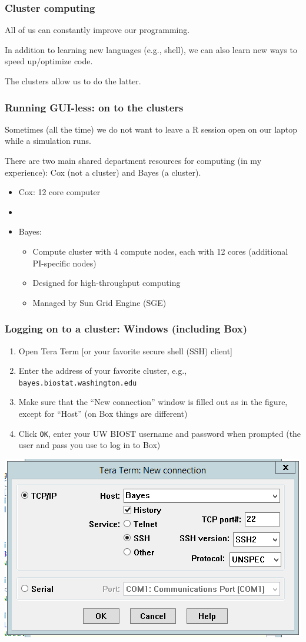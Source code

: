 \documentclass[12pt, 
hyperref={colorlinks=true, linkcolor=blue, urlcolor=cyan}]{beamer}
\newcommand{\myframe}[1]{\begin{frame} \frametitle{#1}}
\begin{document}
\myframe{Cluster computing}
All of us can constantly improve our programming.

In addition to learning new languages (e.g., shell), we can also learn new ways to speed up/optimize code.

The clusters allow us to do the latter.
\end{frame}

\myframe{Running GUI-less: on to the clusters}
Sometimes (all the time) we do not want to leave a R session open on our laptop while a simulation runs.

There are two main shared department resources for computing (in my experience): Cox (not a cluster) and Bayes (a cluster).

\begin{itemize}
\item Cox: 12 core computer 
\item[]
\item Bayes: 
\begin{itemize}
\item Compute cluster with 4 compute nodes, each with 12 cores (additional PI-specific nodes)
\item Designed for high-throughput computing
\item Managed by Sun Grid Engine (SGE)
\end{itemize}
\end{itemize}
\centering
\end{frame}

\myframe{Logging on to a cluster: Windows (including Box)}
\begin{enumerate}
\item Open Tera Term [or your favorite secure shell (SSH) client]
\item Enter the address of your favorite cluster, e.g., \texttt{bayes.biostat.washington.edu}
\item Make sure that the ``New connection'' window is filled out as in the figure, except for ``Host'' (on Box things are different)
\item Click \texttt{OK}, enter your UW BIOST username and password when prompted (the user and pass you use to log in to Box) 
\end{enumerate}
\centering
\includegraphics[width = .45\textwidth]{tera_term_example.png}
\end{frame}
\end{document}
